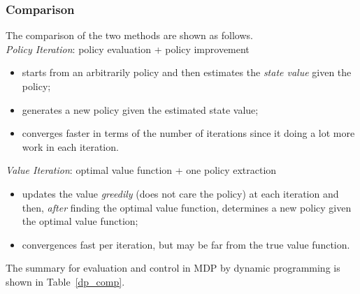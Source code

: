 \documentclass{progartcn}
\begin{document}
	\subsubsection{Comparison}
		The comparison of the two methods are shown as follows.\\

		\textit{Policy Iteration}: policy evaluation + policy improvement
		\begin{itemize}[noitemsep,topsep=0pt]
		\item starts from an arbitrarily policy and then estimates the \textit{state value} given the policy;
		\item generates a new policy given the estimated state value;
		\item converges faster in terms of the number of iterations since it doing a lot more work in each iteration.\\
 		\end{itemize}

		\textit{Value Iteration}: optimal value function + one policy extraction
		\begin{itemize}[noitemsep,topsep=0pt]
			\item updates the value \textit{greedily} (does not care the policy) at each iteration and then, \textit{after} finding the optimal value function, determines a new policy given the optimal value function;
  			\item convergences fast per iteration, but may be far from the true value function.\\
		\end{itemize}

		The summary for evaluation and control in MDP by dynamic programming is shown in Table~\ref{dp_comp}.
	
\end{document}
